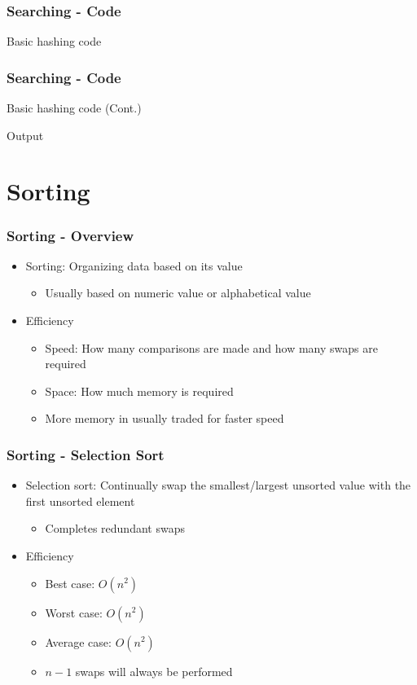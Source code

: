 \documentclass[c, aspectratio=169]{beamer}
\begin{document}
\begin{frame}\frametitle{Searching - Code}
Basic hashing code

\end{frame}

\begin{frame}\frametitle{Searching - Code}
Basic hashing code (Cont.)

Output

\end{frame}

\section{Sorting}
\begin{frame}\frametitle{Sorting - Overview}
\begin{itemize}
\item Sorting: Organizing data based on its value
	\begin{itemize}
	\item Usually based on numeric value or alphabetical value
	\end{itemize}
\item Efficiency
	\begin{itemize}
	\item Speed: How many comparisons are made and how many swaps are required
	\item Space: How much memory is required
	\item More memory in usually traded for faster speed
	\end{itemize}
\end{itemize}
\end{frame}

\begin{frame}\frametitle{Sorting - Selection Sort}
\begin{itemize}
\item Selection sort: Continually swap the smallest/largest unsorted value with the first unsorted element
	\begin{itemize}
	\item Completes redundant swaps
	\end{itemize}
\item Efficiency
	\begin{itemize}
	\item Best case: $O(n^2)$
	\item Worst case: $O(n^2)$
	\item Average case: $O(n^2)$
	\item $n - 1$ swaps will always be performed
	\end{itemize}
\end{itemize}
\end{frame}
\end{document}
